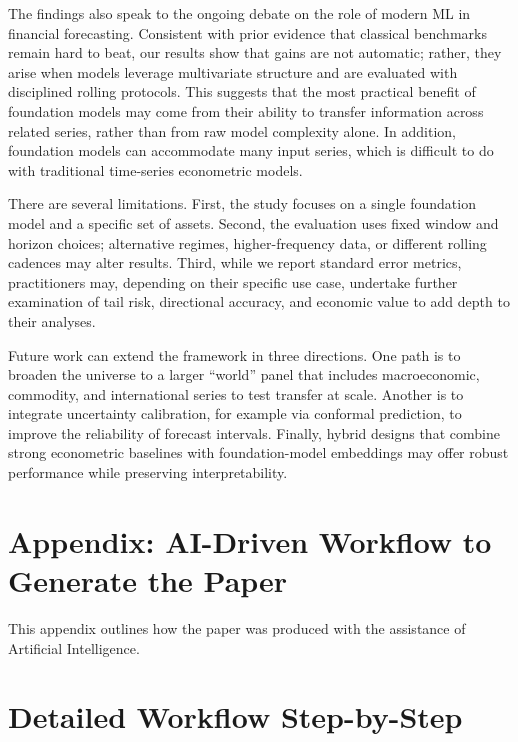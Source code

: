 \documentclass[twocolumn]{article}
\begin{document}
The findings also speak to the ongoing debate on the role of modern ML in financial forecasting. Consistent with prior evidence that classical benchmarks remain hard to beat, our results show that gains are not automatic; rather, they arise when models leverage multivariate structure and are evaluated with disciplined rolling protocols. This suggests that the most practical benefit of foundation models may come from their ability to transfer information across related series, rather than from raw model complexity alone. In addition,  foundation models can accommodate many input series, which is difficult to do with traditional time-series econometric models. 

There are several limitations. First, the study focuses on a single foundation model and a specific set of assets. Second, the evaluation uses fixed window and horizon choices; alternative regimes, higher-frequency data, or different rolling cadences may alter results. Third, while we report standard error metrics, practitioners may, depending on their specific use case, undertake further examination of tail risk, directional accuracy, and economic value to add depth to their analyses. 

Future work can extend the framework in three directions. One path is to broaden the universe to a larger ``world'' panel that includes macroeconomic, commodity, and international series to test transfer at scale. Another is to integrate uncertainty calibration, for example via conformal prediction, to improve the reliability of forecast intervals. Finally, hybrid designs that combine strong econometric baselines with foundation-model embeddings may offer robust performance while preserving interpretability.


\clearpage

\balance



\appendix

\section{Appendix: AI-Driven Workflow to Generate the Paper}
\label{ai_workflow}

This appendix outlines how the paper was produced with the assistance of Artificial Intelligence.


\section*{Detailed Workflow Step-by-Step}
\end{document}

